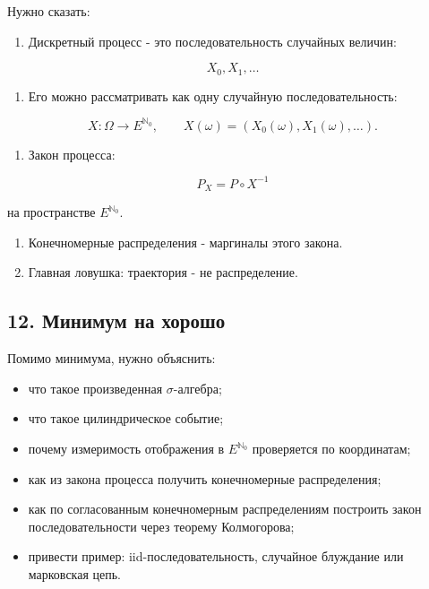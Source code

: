 \documentclass[
  11pt,
  a4paper,
]{article}
\providecommand{\tightlist}{%
  \setlength{\itemsep}{0pt}\setlength{\parskip}{0pt}}
\begin{document}
Нужно сказать:

\begin{enumerate}
\def\labelenumi{\arabic{enumi}.}
\tightlist
\item
  Дискретный процесс - это последовательность случайных величин:
\end{enumerate}

\[
X_0,X_1,\ldots
\]

\begin{enumerate}
\def\labelenumi{\arabic{enumi}.}
\setcounter{enumi}{1}
\tightlist
\item
  Его можно рассматривать как одну случайную последовательность:
\end{enumerate}

\[
X:\Omega\to E^{\mathbb N_0},
\qquad
X(\omega)=(X_0(\omega),X_1(\omega),\ldots).
\]

\begin{enumerate}
\def\labelenumi{\arabic{enumi}.}
\setcounter{enumi}{2}
\tightlist
\item
  Закон процесса:
\end{enumerate}

\[
P_X=P\circ X^{-1}
\]

на пространстве \(E^{\mathbb N_0}\).

\begin{enumerate}
\def\labelenumi{\arabic{enumi}.}
\setcounter{enumi}{3}
\item
  Конечномерные распределения - маргиналы этого закона.
\item
  Главная ловушка: траектория - не распределение.
\end{enumerate}

\subsection{12. Минимум на
хорошо}\label{ux43cux438ux43dux438ux43cux443ux43c-ux43dux430-ux445ux43eux440ux43eux448ux43e}

Помимо минимума, нужно объяснить:

\begin{itemize}
\tightlist
\item
  что такое произведенная \(\sigma\)-алгебра;
\item
  что такое цилиндрическое событие;
\item
  почему измеримость отображения в \(E^{\mathbb N_0}\) проверяется по
  координатам;
\item
  как из закона процесса получить конечномерные распределения;
\item
  как по согласованным конечномерным распределениям построить закон
  последовательности через теорему Колмогорова;
\item
  привести пример: iid-последовательность, случайное блуждание или
  марковская цепь.
\end{itemize}
\end{document}
